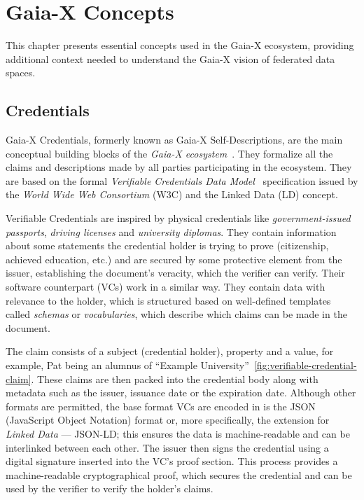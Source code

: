 \chapter{Gaia-X Concepts}\label{ch:gaia-x-concepts}

\begin{chapterabstract}
    This chapter presents essential concepts used in the Gaia-X ecosystem, providing additional context needed to understand the Gaia-X vision of federated data spaces.
\end{chapterabstract}

\section{Credentials}\label{sec:credentials}

Gaia-X Credentials, formerly known as Gaia-X Self-Descriptions, are the main conceptual building blocks of the \textit{Gaia-X ecosystem}~\cite{gaiax_architecture_document}.
They formalize all the claims and descriptions made by all parties participating in the ecosystem.
They are based on the formal \textit{Verifiable Credentials Data Model}~\cite{verifiable_credentials} specification issued by the \textit{World Wide Web Consortium} (W3C) and the Linked Data (LD) concept.

Verifiable Credentials are inspired by physical credentials like \textit{government-issued passports}, \textit{driving licenses} and \textit{university diplomas}.
They contain information about some statements the credential holder is trying to prove (citizenship, achieved education, etc.) and are secured by some protective element from the issuer, establishing the document's veracity, which the verifier can verify.
Their software counterpart (VCs) work in a similar way.
They contain data with relevance to the holder, which is structured based on well-defined templates called \textit{schemas} or \textit{vocabularies}, which describe which claims can be made in the document.

The claim consists of a subject (credential holder), property and a value, for example, Pat being an alumnus of ``Example University''~\ref{fig:verifiable-credential-claim}.
These claims are then packed into the credential body along with metadata such as the issuer, issuance date or the expiration date.
Although other formats are permitted, the base format VCs are encoded in is the JSON (JavaScript Object Notation) format or, more specifically, the extension for \textit{Linked Data} --- JSON-LD; this ensures the data is machine-readable and can be interlinked between each other.
The issuer then signs the credential using a digital signature inserted into the VC's proof section.
This process provides a machine-readable cryptographical proof, which secures the credential and can be used by the verifier to verify the holder's claims.

